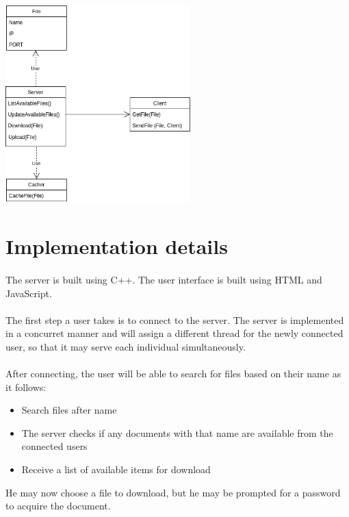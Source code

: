 \documentclass[paper=a4, fontsize=11pt]{scrartcl}
\begin{document}
\paragraph{}
\includegraphics[width=270px]{diagram.png}

\newpage

\section{Implementation details}
\paragraph{}
The server is built using C++. The user interface is built using HTML and JavaScript.
\paragraph{}
The first step a user takes is to connect to the server. The server is implemented in a concurret manner and will assign a different thread for the newly connected user, so that it may serve each individual simultaneously.
\paragraph{}
After connecting, the user will be able to search for files based on their name as it follows:
\begin{itemize}  
\item Search files after name
\item The server checks if any documents with that name are available from the connected users
\item Receive a list of available items for download
\end{itemize}
He may now choose a file to download, but he may be prompted for a password to acquire the document.
\end{document}
